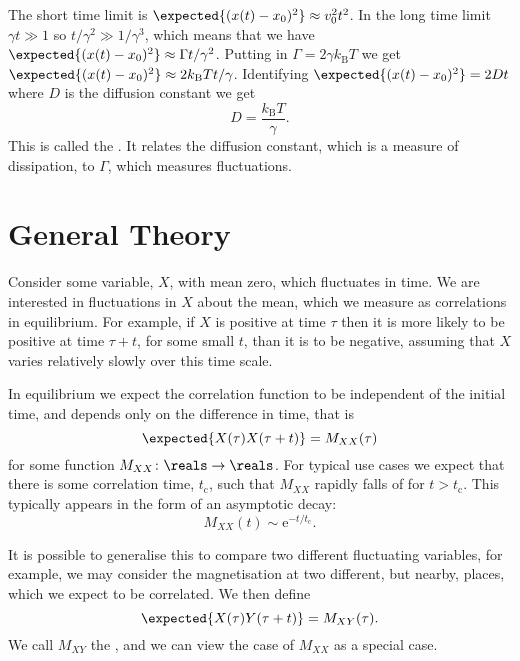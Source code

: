 \documentclass[fleqn]{NotesClass}
\newcommand*{\boltzmann}{k_{\mathrm{B}}}
\newcommand*{\e}{\mathrm{e}}
\begin{document}
    The short time limit is \(\expected{(x(t) - x_0)^2} \approx v_0^2t^2\).
    In the long time limit \(\gamma t \gg 1\) so \(t/\gamma^2 \gg 1/\gamma^3\), which means that we have \(\expected{(x(t) - x_0)^2} \approx \Gamma t/\gamma^2\).
    Putting in \(\Gamma = 2\gamma \boltzmann T\) we get \(\expected{(x(t) - x_0)^2} \approx 2\boltzmann Tt/\gamma\).
    Identifying \(\expected{(x(t) - x_0)^2} = 2Dt\) where \(D\) is the diffusion constant we get
    \begin{equation}
        D = \frac{\boltzmann T}{\gamma}.
    \end{equation}
    This is called the .
    It relates the diffusion constant, which is a measure of dissipation, to \(\Gamma\), which measures fluctuations.
    
    \section{General Theory}
    Consider some variable, \(X\), with mean zero, which fluctuates in time.
    We are interested in fluctuations in \(X\) about the mean, which we measure as correlations in equilibrium.
    For example, if \(X\) is positive at time \(\tau\) then it is more likely to be positive at time \(\tau + t\), for some small \(t\), than it is to be negative, assuming that \(X\) varies relatively slowly over this time scale.
    
    In equilibrium we expect the correlation function to be independent of the initial time, and depends only on the difference in time, that is
    \begin{equation}
        \expected{X(\tau)X(\tau + t)} = M_{XX}(\tau)
    \end{equation}
    for some function \(M_{XX} \colon \reals \to \reals\).
    For typical use cases we expect that there is some correlation time, \(t_{\mathrm{c}}\), such that \(M_{XX}\) rapidly falls of for \(t > t_{\mathrm{c}}\).
    This typically appears in the form of an asymptotic decay:
    \begin{equation}
        M_{XX}(t) \sim \e^{-t/t_{\mathrm{c}}}.
    \end{equation}
    
    It is possible to generalise this to compare two different fluctuating variables, for example, we may consider the magnetisation at two different, but nearby, places, which we expect to be correlated.
    We then define
    \begin{equation}
        \expected{X(\tau)Y(\tau + t)} = M_{XY}(\tau).
    \end{equation}
    We call \(M_{XY}\) the , and we can view the case of \(M_{XX}\) as a special case.
    
\end{document}
